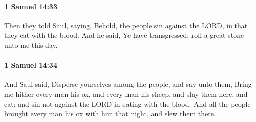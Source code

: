 		\paragraph{1 Samuel 14:33} %
			\label{1SAMUEL-14-33}

			Then they told Saul, saying, Behold, the people sin against the LORD, in that they eat with the blood. And he said, Ye have transgressed: roll a great stone unto me this day.


		\paragraph{1 Samuel 14:34} %
			\label{1SAMUEL-14-34}

			And Saul said, Disperse yourselves among the people, and say unto them, Bring me hither every man his ox, and every man his sheep, and slay them here, and eat; and sin not against the LORD in eating with the blood. And all the people brought every man his ox with him that night, and slew them there.

